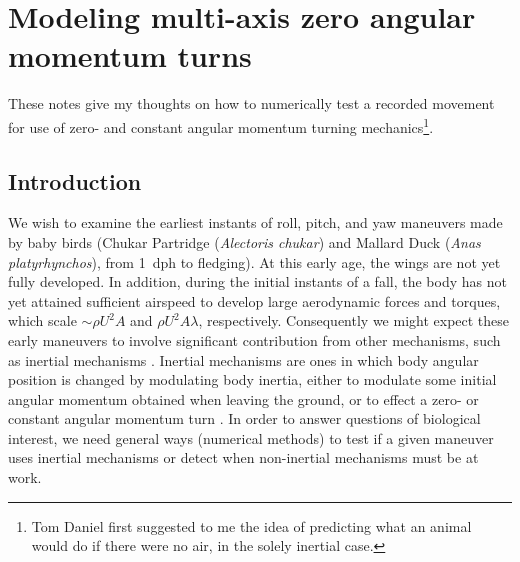 
\chapter{Modeling multi-axis zero angular momentum turns}
\label{app:ang}
These notes give my thoughts on how to numerically test a recorded movement for use of zero- and constant angular momentum turning mechanics\footnote{Tom Daniel first suggested to me the idea of predicting what an animal would do if there were no air, in the solely inertial case.}.

\section{Introduction}
We wish to examine the earliest instants of roll, pitch, and yaw maneuvers made by baby birds (Chukar Partridge (\emph{Alectoris chukar}) and Mallard Duck (\emph{Anas platyrhynchos}), from \SI{1}{dph} to fledging).  At this early age, the wings are not yet fully developed.  In addition, during the initial instants of a fall, the body has not yet attained sufficient airspeed to develop large aerodynamic forces and torques, which scale $\sim \rho U^2 A$ and $\rho U^2 A \lambda$, respectively.  Consequently we might expect these early maneuvers to involve significant contribution from other mechanisms, such as inertial mechanisms \cite{Edwards:1986, Jusufi:2008, Jusufi:2010}.  Inertial mechanisms are ones in which body angular position is changed by modulating body inertia, either to modulate some initial angular momentum obtained when leaving the ground, or to effect a zero- or constant angular momentum turn \cite{Edwards:1986}.  In order to answer questions of biological interest, we need general ways (numerical methods) to test if a given maneuver uses inertial mechanisms or detect when non-inertial mechanisms must be at work. 






